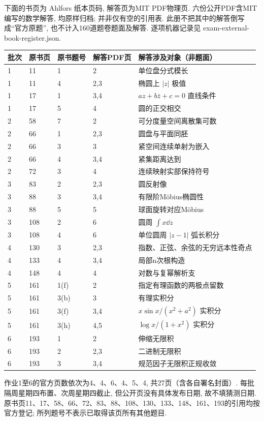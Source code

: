 \noindent 下面的书页为 Ahlfors 纸本页码, 解答页为MIT PDF物理页. 六份公开PDF含MIT编写的数学解答, 均原样归档; 并非仅有空的引用表. 此册不把其中的解答倒写成“官方原题”, 也不计入160道题卷题面及解答. 逐项机器记录见 exam-external-book-register.json.
\begingroup\setlength{\tabcolsep}{3pt}
\begin{longtable}{@{}p{}p{}p{}p{}p{}@{}}
\toprule 批次&原书页&原书题号&解答PDF页&解答涉及对象（非题面）\\\midrule\endhead
1&11&1&2&单位盘分式模长\\
1&11&4&2,3&椭圆上 $|z|$ 极值\\
1&17&1&3,4&$az+b\bar z+c=0$ 直线条件\\
1&17&5&4&圆的正交相交\\
2&58&7&2&可分度量空间离散集可数\\
2&66&1&2,3&圆盘与平面同胚\\
2&66&3&3&紧空间连续单射为嵌入\\
2&66&4&3,4&紧集距离达到\\
2&72&3&4&连续映射实部保持符号\\
3&83&2&2,3&圆反射像\\
3&88&3&3,4&有限阶Möbius椭圆性\\
3&88&5&5&球面旋转对应Möbius\\
3&108&2&6&圆周 $\int x\dd z$\\
3&108&4&6&单位圆周 $|z-1|$ 弧长积分\\
4&130&3&2,3&指数、正弦、余弦的无穷远本性奇点\\
4&133&4&3,4&局部n次根构造\\
4&148&4&4&对数与复幂解析支\\
5&161&1(f)&2&指定有理函数的两极点留数\\
5&161&3(b)&3&有理实积分\\
5&161&3(f)&3,4&$x\sin x/(x^2+a^2)$ 实积分\\
5&161&3(h)&4,5&$\log x/(1+x^2)$ 实积分\\
6&193&1&2&伸缩无限积\\
6&193&2&2,3&二进制无限积\\
6&193&3&3,4&规范因子无限积正规收敛\\
\bottomrule\end{longtable}\endgroup
\noindent 作业1至6的官方页数依次为4、4、6、4、5、4, 共27页（含各自署名封面）. 每批隔周星期四布置、次周星期四截止, 但公开页没有具体发布日期, 故不填猜测日期. 原书页11、17、58、66、72、83、88、108、130、133、148、161、193的引用均按官方登记; 所列题号不表示已取得该页所有其他题目.
